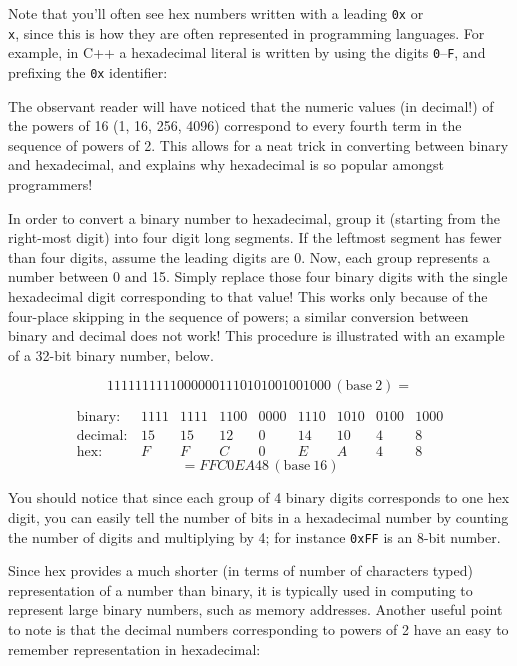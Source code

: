 \documentclass[a4paper]{scrartcl}
\newcommand{\binary}{\ensuremath{\,(\mathrm{base}~2)}}
\newcommand{\hex}{\ensuremath{\,(\mathrm{base}~16)}}
\begin{document}
Note that you'll often see hex numbers written with a leading \texttt{0x} or \texttt{\\x}, since this is how they are often represented in programming languages. For example, in C++ a hexadecimal literal is written by using the digits \texttt{0}--\texttt{F}, and prefixing the \texttt{0x} identifier:



The observant reader will have noticed that the numeric values (in decimal!) of the powers of 16 (1, 16, 256, 4096) correspond to every fourth term in the sequence of powers of 2. This allows for a neat trick in converting between binary and hexadecimal, and explains why hexadecimal is so popular amongst programmers!

In order to convert a binary number to hexadecimal, group it (starting from the right-most digit) into four digit long segments. If the leftmost segment has fewer than four digits, assume the leading digits are 0. Now, each group represents a number between 0 and 15. Simply replace those four binary digits with the single hexadecimal digit corresponding to that value! This works only because of the four-place skipping in the sequence of powers; a similar conversion between binary and decimal does not work! This procedure is illustrated with an example of a 32-bit binary number, below.

\[ 11111111110000001110101001001000\binary = \]

\[\begin{array}{lcccccccc}
\mathrm{binary:}  &1111 & 1111 & 1100 & 0000 & 1110 & 1010 & 0100 & 1000\\
\mathrm{decimal:} &15   & 15   & 12   & 0    & 14   & 10   & 4    & 8   \\
\mathrm{hex:}     &F    & F    & C    & 0    & E    & A    & 4    & 8
\end{array}\]
\[ = FFC0EA48 \hex \]

You should notice that since each group of 4 binary digits corresponds to one hex digit, you can easily tell the number of bits in a hexadecimal number by counting the number of digits and multiplying by 4; for instance \texttt{0xFF} is an 8-bit number.

Since hex provides a much shorter (in terms of number of characters typed) representation of a number than binary, it is typically used in computing to represent large binary numbers, such as memory addresses. Another useful point to note is that the decimal numbers corresponding to powers of 2 have an easy to remember representation in hexadecimal:
\end{document}
